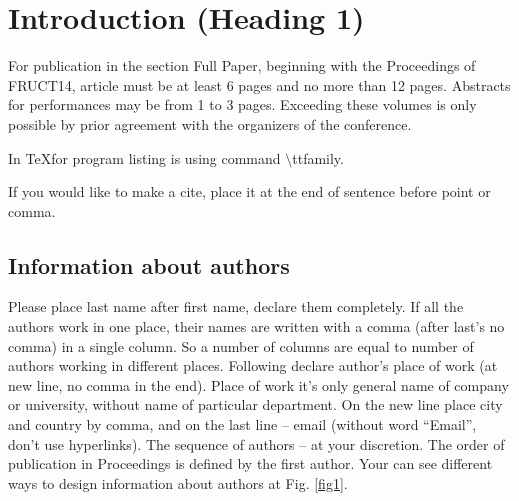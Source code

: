
\section{Introduction (Heading 1)}
For publication in the section Full Paper, beginning with the Proceedings of FRUCT14, article must be at least 6 pages and no more than 12 pages. Abstracts for performances may be from 1 to 3 pages. Exceeding these volumes is only possible by prior agreement with the organizers of the conference.

In \TeX for program listing is using command $\setminus$\ttfamily ttfamily.

\rmfamily
If you would like to make a cite, place it at the end of sentence before point or comma.

\subsection{Information about authors}
Please place last name after first name, declare them completely. If all the authors work in one place, their names are written with a comma (after last's no comma) in a single column. So a number of columns are equal to number of authors working in different places. Following declare author's place of work (at new line, no comma in the end). Place of work it's only general name of company or university, without name of particular department. On the new line place city and country by comma, and on the last line -- email (without word ``Email'', don't use hyperlinks). The sequence of authors -- at your discretion. The order of publication in Proceedings is defined by the first author. Your can see different ways to design information about authors at Fig. \ref{fig1}.

